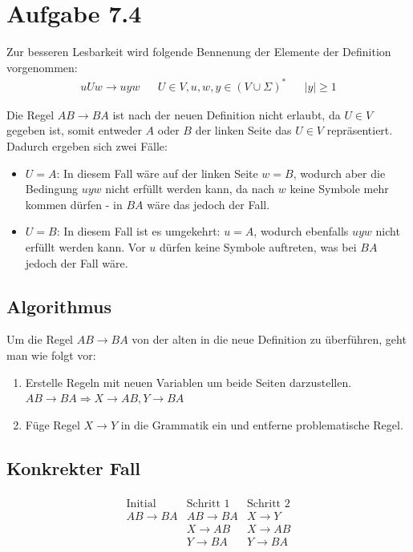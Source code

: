 \documentclass{article}
\begin{document}
\section*{Aufgabe 7.4}
Zur besseren Lesbarkeit wird folgende Bennenung der Elemente der Definition vorgenommen:
\begin{align*}
uUw \rightarrow uyw && U \in V, u,w,y \in \left( V \cup \Sigma \right)^* && |y| \geq 1
\end{align*}

Die Regel $AB\rightarrow BA$ ist nach der neuen Definition nicht erlaubt, da $U \in V$ gegeben ist, somit entweder $A$ oder $B$ der linken Seite das $U \in V$ repräsentiert. Dadurch ergeben sich zwei Fälle:
\begin{itemize}
	\item $U = A$: In diesem Fall wäre auf der linken Seite $w = B$, wodurch aber die Bedingung $uyw$ nicht erfüllt werden kann, da nach $w$ keine Symbole mehr kommen dürfen - in $BA$ wäre das jedoch der Fall.
  \item $U = B$: In diesem Fall ist es umgekehrt: $u = A$, wodurch ebenfalls $uyw$ nicht erfüllt werden kann. Vor $u$ dürfen keine Symbole auftreten, was bei $BA$ jedoch der Fall wäre.
\end{itemize}

\subsection*{Algorithmus}
Um die Regel $AB \rightarrow BA$ von der alten in die neue Definition zu überführen, geht man wie folgt vor:

\begin{enumerate}
	\item Erstelle Regeln mit neuen Variablen um beide Seiten darzustellen.\\ $AB \rightarrow BA \Rightarrow X \rightarrow AB, Y \rightarrow BA$
  \item Füge Regel $X \rightarrow Y$ in die Grammatik ein und entferne problematische Regel.
\end{enumerate}

\subsection*{Konkrekter Fall}
\begin{align*}
\begin{array}{l|l|l}
\text{Initial}    & \text{Schritt 1}  & \text{Schritt 2} \\ \hline
AB \rightarrow BA & AB \rightarrow BA & X \rightarrow Y  \\
                  & X  \rightarrow AB & X \rightarrow AB \\
                  & Y  \rightarrow BA & Y \rightarrow BA \\
\end{array}
\end{align*}
\end{document}
